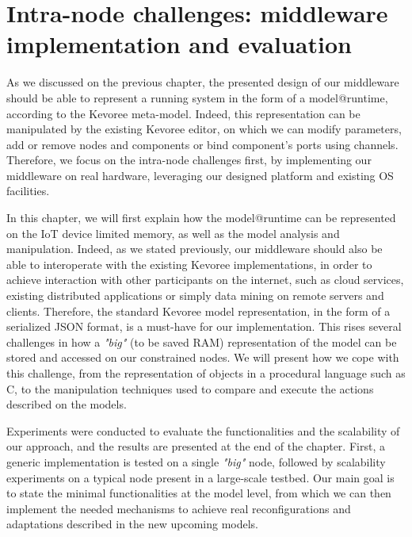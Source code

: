 \chapter{Intra-node challenges: middleware implementation and evaluation}
As we discussed on the previous chapter, the presented design of our middleware should be able to represent a running system in the form of a model@runtime, according to the Kevoree meta-model.
Indeed, this representation can be manipulated by the existing Kevoree editor, on which we can modify parameters, add or remove nodes and components or bind component's ports using channels.
Therefore, we focus on the intra-node challenges first, by implementing our middleware on real hardware, leveraging our designed platform and existing OS facilities.

In this chapter, we will first explain how the model@runtime can be represented on the IoT device limited memory, as well as the model analysis and manipulation.
Indeed, as we stated previously, our middleware should also be able to interoperate with the existing Kevoree implementations, in order to achieve interaction with other participants on the internet, such as cloud services, existing distributed applications or simply data mining on remote servers and clients.
Therefore, the standard Kevoree model representation, in the form of a serialized JSON format, is a must-have for our implementation.
This rises several challenges in how a \textit{"big"} (to be saved RAM) representation of the model can be stored and accessed on our constrained nodes.
We will present how we cope with this challenge, from the representation of objects in a procedural language such as C, to the manipulation techniques used to compare and execute the actions described on the models.

Experiments were conducted to evaluate the functionalities and the scalability of our approach, and the results are presented at the end of the chapter.
First, a generic implementation is tested on a single \textit{"big"} node, followed by scalability experiments on a typical node present in a large-scale testbed.
Our main goal is to state the minimal functionalities at the model level, from which we can then implement the needed mechanisms to achieve real reconfigurations and adaptations described in the new upcoming models.

